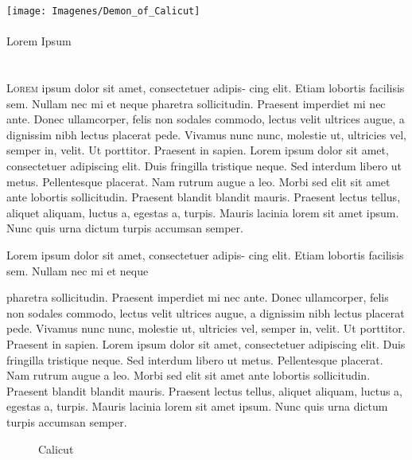 \documentclass[12pt,twoside]{book}
\newcommand{\traps}[5]{
		\lettrine[
			image=true,
			lines=5,
			nindent=2pt,
			depth=#1,
			lraise=#2,
			loversize=#3
			]
			{#4}{\color{black}#5}
		}
\newcommand{\mypart}[1]{%
		\clearpage
			\ifodd\value{page}
			\else
				\hbox{}\newpage
			\fi
		\thispagestyle{empty}
		\vspace*{0.01\textheight} %
		\begin{center}
			\texttt{[image: Imagenes/Demon\_of\_Calicut]}\\[2.0em]
			{\color{Sepia}\Large\Roman{part}}\\[2.0em]
			{\huge#1}
		\end{center}
		\stepcounter{part}
		}
\newcommand{\mytest}{
		\begin{wrapfigure}[6]{o}[12.5pt]{0.2\textwidth}
		\vspace{0pt}
			\reflectbox{
			\texttt{[image: Imagenes/alchemy]}%
				}
		\end{wrapfigure}
		}
\begin{document}
\mypart{Lorem Ipsum}

\chapter{}
\traps{0}{-0.025}{0.05}{L}{orem}
ipsum dolor sit amet, consectetuer adipis- cing elit. Etiam lobortis facilisis sem. Nullam nec mi et neque pharetra sollicitudin. Praesent imperdiet mi nec ante. Donec ullamcorper, felis non sodales commodo, lectus velit ultrices augue, a dignissim nibh lectus placerat pede. Vivamus nunc nunc, molestie ut, ultricies vel, semper in, velit. Ut porttitor. Praesent in sapien. Lorem ipsum dolor sit amet, consectetuer adipiscing elit. Duis fringilla tristique neque. Sed interdum libero ut metus. Pellentesque placerat. Nam rutrum augue a leo. Morbi sed elit sit amet ante lobortis sollicitudin. Praesent blandit blandit mauris. Praesent lectus tellus, aliquet aliquam, luctus a, egestas a, turpis. Mauris lacinia lorem sit amet ipsum. Nunc quis urna dictum turpis accumsan semper.

Lorem ipsum dolor sit amet, consectetuer adipis- cing elit. Etiam lobortis facilisis sem. Nullam nec mi et neque\mytest pharetra sollicitudin. Praesent imperdiet mi nec ante. Donec ullamcorper, felis non sodales commodo, lectus velit ultrices augue, a dignissim nibh lectus placerat pede. Vivamus nunc nunc, molestie ut, ultricies vel, semper in, velit. Ut porttitor. Praesent in sapien. Lorem ipsum dolor sit amet, consectetuer adipiscing elit. Duis fringilla tristique neque. Sed interdum libero ut metus. Pellentesque placerat. Nam rutrum augue a leo. Morbi sed elit sit amet ante lobortis sollicitudin. Praesent blandit blandit mauris. Praesent lectus tellus, aliquet aliquam, luctus a, egestas a, turpis. Mauris lacinia lorem sit amet ipsum. Nunc quis urna dictum turpis accumsan semper.

\begin{wrapfigure}[11]{I}[0pt]{0.5\textwidth}
	\vspace{-25pt}
	\begin{center}
	\end{center}
	\vspace{-20pt}
	\caption{Calicut}
\end{wrapfigure}
\end{document}
